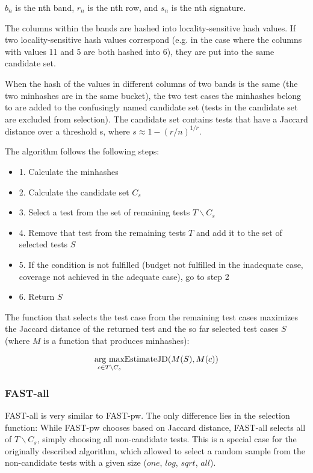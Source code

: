 $b_n$ is the nth band, $r_n$ is the nth row, and $s_n$ is the nth
signature.

The columns within the bands are hashed into locality-sensitive hash
values. If two locality-sensitive hash values correspond (e.g. in the
case where the columns with values 11 and 5 are both hashed into 6),
they are put into the same candidate set.

When the hash of the values in different columns of two bands is the
same (the two minhashes are in the same bucket), the two test cases the
minhashes belong to are added to the confusingly named candidate set
(tests in the candidate set are excluded from selection). The candidate
set contains tests that have a Jaccard distance over a threshold s,
where $s \approx 1-(r/n)^{1/r}$.

The algorithm follows the following steps:

\begin{itemize}
	\item[] 1. Calculate the minhashes
	\item[] 2. Calculate the candidate set $C_s$
	\item[] 3. Select a test from the set of remaining tests $T \backslash C_s$
	\item[] 4. Remove that test from the remaining tests $T$ and add it to the set of selected tests $S$
	\item[] 5. If the condition is not fulfilled (budget not fulfilled in the inadequate case, coverage not achieved in the adequate case), go to step 2
	\item[] 6. Return $S$
\end{itemize}

The function that selects the test case from the remaining test cases
maximizes the Jaccard distance of the returned test and the so far
selected test cases $S$ (where $M$ is a function that produces minhashes):

$$ \underset{c \in T \backslash C_s}{\hbox{arg max}} \hbox{EstimateJD}(M(S), M(c))$$

\subsubsection{FAST-all}

FAST-all is very similar to FAST-pw. The only difference lies in the
selection function: While FAST-pw chooses based on Jaccard distance,
FAST-all selects all of $T \backslash C_s$, simply choosing all
non-candidate tests. This is a special case for the originally described
algorithm, which allowed to select a random sample from the non-candidate
tests with a given size ($one$, $log$, $sqrt$, $all$).

